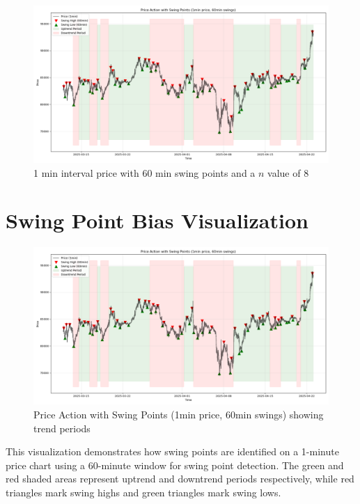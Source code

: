 \documentclass[12pt]{article}
\begin{document}
\newpage

\begin{figure}[H]
  \centering
  \includegraphics[width=\textwidth]{60min_swing_point_bias.png}
  \caption{1 min interval price with 60 min swing points and a $n$ value of 8 }
\end{figure}



\newpage
\section*{Swing Point Bias Visualization}

\begin{figure}[H]
    \centering
    \includegraphics[width=\textwidth]{60min_swing_point_bias.png}
    \caption{Price Action with Swing Points (1min price, 60min swings) showing trend periods}
\end{figure}

This visualization demonstrates how swing points are identified on a 1-minute price chart using a 60-minute window for swing point detection. The green and red shaded areas represent uptrend and downtrend periods respectively, while red triangles mark swing highs and green triangles mark swing lows.
\end{document}

